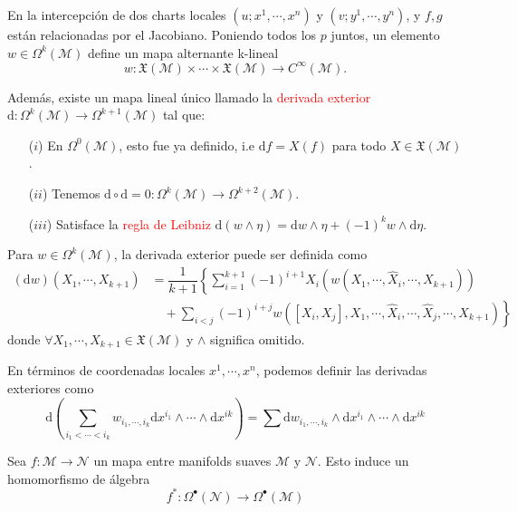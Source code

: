 \documentclass[../main]{subfiles}
\begin{document}
\begin{adjustwidth}{0pt}{-100pt}
En la intercepción de dos charts locales $(u; x^1, \cdots, x^n)$ y $(v; y^1, \cdots, y^n)$, y $f, g$ están relacionadas por el Jacobiano. Poniendo todos los $p$ juntos, un elemento $w \in \Omega^k(\mathcal{M})$ define un mapa alternante k-lineal 
\begin{equation}
    w: \mathfrak{X}(\mathcal{M})\times \cdots \times \mathfrak{X}(\mathcal{M}) \rightarrow C^{\infty}(\mathcal{M}).
\end{equation} 

Además, existe un mapa lineal único llamado la \textcolor{red}{derivada exterior} $\mathrm{d}: \Omega^k(\mathcal{M})\rightarrow \Omega^{k+1}(\mathcal{M})$ tal que:
\begin{enumerate}
    \item[($i$)] En $\Omega^0(\mathcal{M})$, esto fue ya definido, i.e $\mathrm{d}f=X(f)$ para todo $X\in \mathfrak{X}(\mathcal{M})$.
    \item[($ii$)] Tenemos $\mathrm{d} \circ \mathrm{d}=0: \Omega^k(\mathcal{M})\rightarrow \Omega^{k+2}(\mathcal{M})$.
    \item[($iii$)] Satisface la \textcolor{red}{regla de Leibniz} $\mathrm{d}(w \wedge \eta)=\mathrm{d}w \wedge \eta+(-1)^k w \wedge \mathrm{d}\eta$. 
\end{enumerate}
Para $w \in \Omega^k(\mathcal{M})$, la derivada exterior puede ser definida como 
\begin{equation}
    \begin{split}
        (\mathrm{d}w)(X_1, \cdots, X_{k+1})&=\dfrac{1}{k+1}\left\{\sum_{i=1}^{k+1} (-1)^{i+1} X_i\left(w(X_1, \cdots, \hat{X}_i, \cdots, X_{k+1})\right)\right.\\
        &\quad +\left.\sum_{i<j}(-1)^{i+j}w\left([X_i, X_j], X_1, \cdots, \hat{X}_i, \cdots, \hat{X}_j, \cdots, X_{k+1}\right)\right\}
    \end{split}
\end{equation}
donde $\forall X_1, \cdots, X_{k+1} \in \mathfrak{X}(\mathcal{M})$ y $\wedge$ significa omitido.

En términos de coordenadas locales $x^1, \cdots, x^n$, podemos definir las derivadas exteriores como 
\begin{equation}
    \mathrm{d}\left(\sum_{i_1<\cdots<i_k} w_{i_1, \cdots, i_k}\mathrm{d}x^{i_1}\wedge\cdots \wedge \mathrm{d}x^{ik}\right)=\sum \mathrm{d}w_{i_1, \cdots, i_k}\wedge \mathrm{d}x^{i_1}\wedge \cdots \wedge \mathrm{d}x^{ik}
\end{equation}

Sea $f: \mathcal{M}\rightarrow \mathcal{N}$ un mapa entre manifolds suaves $\mathcal{M}$ y $\mathcal{N}$. Esto induce un homomorfismo de álgebra 
\begin{equation}
    f^*: \Omega^{\bullet}(\mathcal{N})\rightarrow \Omega^{\bullet}(\mathcal{M})
\end{equation}


\end{adjustwidth}
\end{document}

